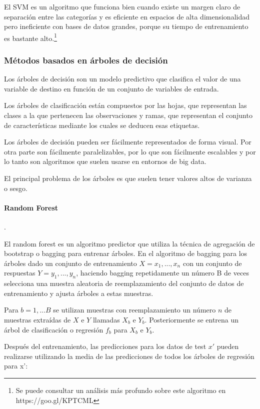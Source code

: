 \documentclass[11pt,a4paper,spanish]{article} %
\begin{document}
El SVM es un algoritmo que funciona bien cuando existe un margen claro de separación entre las categorías y es eficiente en espacios de alta dimensionalidad pero ineficiente con bases de datos grandes, porque su tiempo de entrenamiento es bastante alto.\footnote{Se puede consultar un análisis más profundo sobre este algoritmo en https://goo.gl/KPTCML}

\subsubsection{Métodos basados en árboles de decisión}

Los árboles de decisión son un modelo predictivo que clasifica el valor de una variable de destino en función de un conjunto de variables de entrada.  

Los árboles de clasificación están compuestos por las hojas, que representan las clases a la que pertenecen las observaciones y ramas, que representan el conjunto de características mediante los cuales se deducen esas etiquetas.

Los árboles de decisión pueden ser fácilmente representados de forma visual. Por otra parte son fácilmente paralelizables, por lo que son fácilmente escalables y por lo tanto son algoritmos que suelen usarse en entornos de big data. 

El principal problema de los árboles es que  suelen tener valores altos de varianza o sesgo. 

\paragraph{Random Forest}  .


El random forest es un algoritmo predictor que utiliza la técnica de agregación de bootstrap o bagging para entrenar árboles. En el algoritmo de bagging para los árboles dado un conjunto de entrenamiento $X = x_1, ..., x_n$ con un conjunto de respuestas $Y = y_1, ..., y_n$, haciendo bagging repetidamente un número B de veces selecciona una muestra aleatoria de reemplazamiento del conjunto de datos de entrenamiento y ajusta árboles a estas muestras.

Para $b = 1, ... B$ se utilizan muestras con reemplazamiento un número $n$ de muestras extraídas de $X$ e $Y$ llamadas $X_b$ e $Y_b$. Posteriormente se entrena un árbol de clasificación o regresión $f_b$ para $X_b$ e $Y_b$. 

Después del entrenamiento, las predicciones para los datos de test $x'$ pueden realizarse utilizando la media de las predicciones de todos los árboles de regresión para x':
\end{document}
